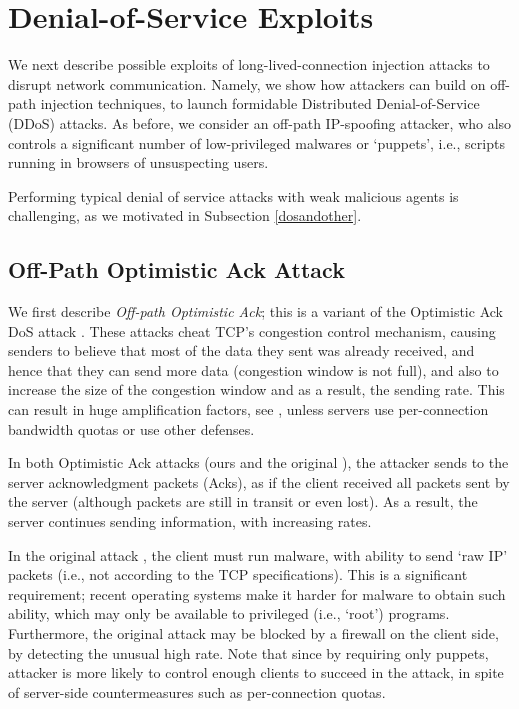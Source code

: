 \documentclass[conference]{IEEEtran}
\begin{document}
\section{Denial-of-Service Exploits} \label{exploits:DoS}
We next describe possible exploits of long-lived-connection injection attacks to disrupt network communication. Namely, we show how attackers can build on off-path injection techniques, to launch formidable Distributed Denial-of-Service (DDoS) attacks. As before, we consider an off-path IP-spoofing attacker, who also controls a significant number of low-privileged malwares or `puppets', i.e., scripts running in browsers of unsuspecting users. 

Performing typical denial of service attacks with weak malicious agents is challenging, as we motivated in Subsection \ref{dosandother}.

\subsection{Off-Path Optimistic Ack Attack} 
We first describe {\em Off-path Optimistic Ack}; this is a variant of the Optimistic Ack DoS attack  \cite{SBB05:OptAck}. These attacks cheat TCP's congestion control mechanism, causing senders to believe that most of the data they sent was already received, and hence that they can send more data (congestion window is not full), and also to increase the size of the congestion window and as a result, the sending rate. This can result in huge amplification factors, see \cite{SBB05:OptAck}, unless servers use per-connection bandwidth quotas or use other defenses. 

In both Optimistic Ack attacks (ours and the original \cite{SBB05:OptAck}), the attacker sends to the server acknowledgment packets (Acks), as if the client received all packets sent by the server (although packets are still in transit or even lost). As a result, the server continues sending information, with increasing rates. 

In the original attack \cite{SBB05:OptAck}, the client must run malware, with ability to send `raw IP' packets (i.e., not according to the TCP specifications). This is a significant requirement; recent operating systems make it harder for malware to obtain such ability, which may only be available to privileged (i.e., `root') programs. Furthermore, the original attack may be blocked by a firewall on the client side, by detecting the unusual high rate. Note that since by requiring only puppets, attacker is more likely to control enough clients to succeed in the attack, in spite of server-side countermeasures such as per-connection quotas. 
\end{document}
